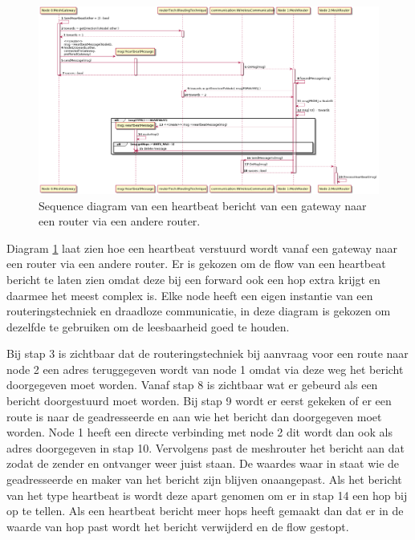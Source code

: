 \documentclass[a4paper, 11pt, oneside]{report}
\begin{document}
\begin{figure}[H]
	\begin{center}\includegraphics[width=\linewidth]{UML/out/Communication/Sequence/ForwardHeartbeat/ForwardHeartbeat.png}\end{center}
	\caption{Sequence diagram van een heartbeat bericht van een gateway naar een router via een andere router.}
	\label{fig:communication:sequence:sequence:heartbeatgateway->router->router}
\end{figure}
Diagram \ref{fig:communication:sequence:sequence:heartbeatgateway->router->router} laat zien hoe een heartbeat verstuurd wordt vanaf een gateway naar een router via een andere router.
Er is gekozen om de flow van een heartbeat bericht te laten zien omdat deze bij een forward ook een hop extra krijgt en daarmee het meest complex is.
Elke node heeft een eigen instantie van een routeringstechniek en draadloze communicatie, in deze diagram is gekozen om dezelfde te gebruiken om de leesbaarheid goed te houden.

Bij stap 3 is zichtbaar dat de routeringstechniek bij aanvraag voor een route naar node 2 een adres teruggegeven wordt van node 1 omdat via deze weg het bericht doorgegeven moet worden.
Vanaf stap 8 is zichtbaar wat er gebeurd als een bericht doorgestuurd moet worden.
Bij stap 9 wordt er eerst gekeken of er een route is naar de geadresseerde en aan wie het bericht dan doorgegeven moet worden.
Node 1 heeft een directe verbinding met node 2 dit wordt dan ook als adres doorgegeven in stap 10.
Vervolgens past de meshrouter het bericht aan dat zodat de zender en ontvanger weer juist staan. 
De waardes waar in staat wie de geadresseerde en maker van het bericht zijn blijven onaangepast.
Als het bericht van het type heartbeat is wordt deze apart genomen om er in stap 14 een hop bij op te tellen.
Als een heartbeat bericht meer hops heeft gemaakt dan dat er in de waarde van hop past wordt het bericht verwijderd en de flow gestopt.
\end{document}
